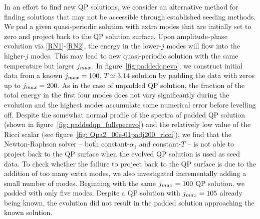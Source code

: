 \documentclass[../PhD.tex]{subfiles}
\begin{document}
\vspace{-0.1in}

In an effort to find new QP solutions, we consider an alternative method for finding solutions that may not be accessible through established seeding methods. We pad a given quasi-periodic solution with extra modes that are initially set to zero and project back to the QP solution surface. Upon amplitude-phase evolution via \eqref{RN1}-\eqref{RN2}, the energy in the lower-$j$ modes will flow into the higher-$j$ modes. This may lead to new quasi-periodic solution with the same temperature but larger $j_{max}$. In figure~\ref{fig:paddedqpevo}, we construct initial data from a known $j_{max} = 100$, $T \simeq 3.14$ solution by padding the data with zeros up to $j_{max} = 200$. As in the case of unpadded QP solution, the fraction of the total energy in the first four modes does not vary significantly during the evolution and the highest modes accumulate some numerical error before levelling off. Despite the somewhat normal profile of the spectra of padded QP solution (shown in figure~\ref{fig: paddedqp_fullspecevo}) and the relatively low value of the Ricci scalar (see figure~\ref{fig: Qpa2_00e-01padj200_ricci}), we find that the Newton-Raphson solver -- both constant-$\alpha_1$ and constant-$T$ -- is not able to project back to the QP surface when the evolved QP solution is used as seed data. To check whether the failure to project back to the QP surface is due to the addition of too many extra modes, we also investigated incrementally adding a small number of modes. Beginning with the same $j_{max} = 100$ QP solution, we padded with only five modes. Despite a QP solution with $j_{max} = 105$ already being known, the evolution did not result in the padded solution approaching the known solution. 
\end{document}
